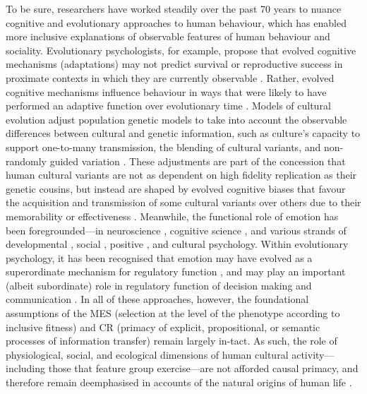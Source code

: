 \begin{CJK}{UTF8}{gbsn}
To be sure, researchers have worked steadily over the past 70 years to nuance cognitive and evolutionary approaches to human behaviour, which has enabled more inclusive explanations of observable features of human behaviour and sociality.  Evolutionary psychologists, for example, propose that evolved cognitive mechanisms (adaptations) may not predict survival or reproductive success in proximate contexts in which they are currently observable \citep[as per the assumption utilised in human behavioural ecology known as the ``phenotypic gambit;'' see][]{Grafen1984}.  Rather, evolved cognitive mechanisms influence behaviour in ways that were likely to have performed an adaptive function over evolutionary time \citep[a theoretical formulation known as the ``environment of evolutionary adaptiveness'' (EEA)][]{Cosmides1992a,Buss1998}.  Models of cultural evolution adjust population genetic models to take into account the observable differences between cultural and genetic information, such as culture's capacity to support one-to-many transmission, the blending of cultural variants, and non-randomly guided variation \citep{Cavalli-Sforza1981,Boyd1988}.  These adjustments are part of the concession that human cultural variants are not as dependent on high fidelity replication as their genetic cousins, but instead are shaped by evolved cognitive biases that favour the acquisition and transmission of some cultural variants over others due to their memorability or effectiveness \citep[i.e., context sensitivity][]{Henrich2007}.
Meanwhile, the functional role of emotion has been foregrounded---in neuroscience \citep{Damasio1994}, cognitive science \citep{Lazarus1982}, and various strands of developmental \citep{Campos1989}, social \citep{Parrott2001}, positive \citep{Fredrickson2001}, and cultural \citep{Nisbett2003} psychology.
Within evolutionary psychology, it has been recognised that emotion may have evolved as a superordinate mechanism for regulatory function \citep{Cosmides2000}, and may play an important (albeit subordinate) role in regulatory function of decision making \citep{Dalgleish2004} and communication \citep{Rime2009}.  In all of these approaches, however, the foundational assumptions of the MES (selection at the level of the phenotype according to inclusive fitness) and CR (primacy of explicit, propositional, or semantic processes of information transfer) remain largely in-tact.  As such, the role of physiological, social, and ecological dimensions of human cultural activity---including those that feature group exercise---are not afforded causal primacy, and therefore remain deemphasised in accounts of the natural origins of human life \citep{Badcock2012}.


\end{CJK}
